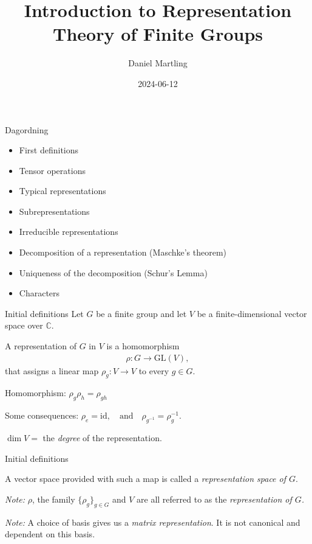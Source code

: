 \documentclass[handout,  12pt]{beamer}
\newcommand{\1}{\mathbf{1}}
\newcommand{\0}{\mathbf{0}}
\newcommand{\GL}{\text{GL}}
\begin{document}
	\author{Daniel Martling}
	\title{Introduction to Representation Theory of Finite Groups}
	\date{2024-06-12}
	\begin{frame}
		\maketitle
	\end{frame}
	\begin{frame}{Dagordning}
		\begin{itemize}
			\item First definitions
			\item Tensor operations
			\item Typical representations
			\item Subrepresentations
			\item Irreducible representations
			\item Decomposition of a representation (Maschke's theorem)
			\item Uniqueness of the decomposition (Schur's Lemma)
			\item Characters
		\end{itemize}
	\end{frame}
	
	
	\begin{frame}{Initial definitions}
		Let $G$ be a finite group and let $V$ be a finite-dimensional vector space over $\mathbb{C}$. \pause
		
		\begin{definition}
			A representation of $G$ in $V$ is a homomorphism
			\begin{align*}
				\rho : G \rightarrow \GL(V),
			\end{align*}
			that assigns a linear map $\rho_g: V \rightarrow V$ to every $g \in G$.
		\end{definition} \pause
		
		Homomorphism: 
			$\rho_g \rho_h = \rho_{gh}$ \pause
		
		Some consequences:
		$
			\rho_e = \text{id}, \quad \text{and} \quad \rho_{g^{-1}} = \rho_g^{-1}.
		$\pause
		
		$\dim V =$ the \textit{degree} of the representation.
	\end{frame}
	
	\begin{frame}{Initial definitions}
		\begin{definition}
			A vector space provided with such a map is called a \textit{representation space of $G$}.
		\end{definition} \pause
		
		\textit{Note:} $\rho$, the family $\{\rho_g\}_{g\in G}$ and $V$ are all referred to as the \textit{representation of $G$.} \pause
		
		\textit{Note:} A choice of basis gives us a \textit{matrix representation}. It is not canonical and dependent on this basis. 

	\end{frame}
	
\end{document}
